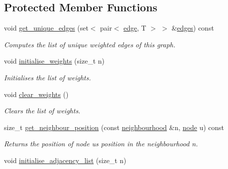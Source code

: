 \subsection*{Protected Member Functions}
\begin{DoxyCompactItemize}
\item 
void \hyperlink{classlgraph_1_1utils_1_1wdgraph_acc8feed5dcf672b31839ea2a06512c21}{get\+\_\+unique\+\_\+edges} (set$<$ pair$<$ \hyperlink{namespacelgraph_1_1utils_a6510284ce1b1ae5dc97ce5d2de426e10}{edge}, T $>$ $>$ \&\hyperlink{classlgraph_1_1utils_1_1wxgraph_a73b6c8887d5088750ee2cc98c45089c6}{edges}) const 
\begin{DoxyCompactList}\small\item\em Computes the list of unique weighted edges of this graph. \end{DoxyCompactList}\item 
void \hyperlink{classlgraph_1_1utils_1_1wxgraph_a0b0c0b54acbc7816eb5b9958e61805cf}{initialise\+\_\+weights} (size\+\_\+t n)\hypertarget{classlgraph_1_1utils_1_1wxgraph_a0b0c0b54acbc7816eb5b9958e61805cf}{}\label{classlgraph_1_1utils_1_1wxgraph_a0b0c0b54acbc7816eb5b9958e61805cf}

\begin{DoxyCompactList}\small\item\em Initialises the list of weights. \end{DoxyCompactList}\item 
void \hyperlink{classlgraph_1_1utils_1_1wxgraph_a145f81ae3609af5ec038ace8b4413fad}{clear\+\_\+weights} ()\hypertarget{classlgraph_1_1utils_1_1wxgraph_a145f81ae3609af5ec038ace8b4413fad}{}\label{classlgraph_1_1utils_1_1wxgraph_a145f81ae3609af5ec038ace8b4413fad}

\begin{DoxyCompactList}\small\item\em Clears the list of weights. \end{DoxyCompactList}\item 
size\+\_\+t \hyperlink{classlgraph_1_1utils_1_1xxgraph_aac7ef2134cad9529869f1334de7892d9}{get\+\_\+neighbour\+\_\+position} (const \hyperlink{namespacelgraph_1_1utils_a0f2ef47028a466d26841709e705390ac}{neighbourhood} \&n, \hyperlink{namespacelgraph_1_1utils_a7bd66ede3805ef121bc2835bd48de0cf}{node} u) const 
\begin{DoxyCompactList}\small\item\em Returns the position of node {\itshape u\textquotesingle{}s} position in the neighbourhood {\itshape n}. \end{DoxyCompactList}\item 
void \hyperlink{classlgraph_1_1utils_1_1xxgraph_a2201aaff5e9ffa29a9b3abfde705dd46}{initialise\+\_\+adjacency\+\_\+list} (size\+\_\+t n)\hypertarget{classlgraph_1_1utils_1_1xxgraph_a2201aaff5e9ffa29a9b3abfde705dd46}{}\label{classlgraph_1_1utils_1_1xxgraph_a2201aaff5e9ffa29a9b3abfde705dd46}


\end{DoxyCompactItemize}
